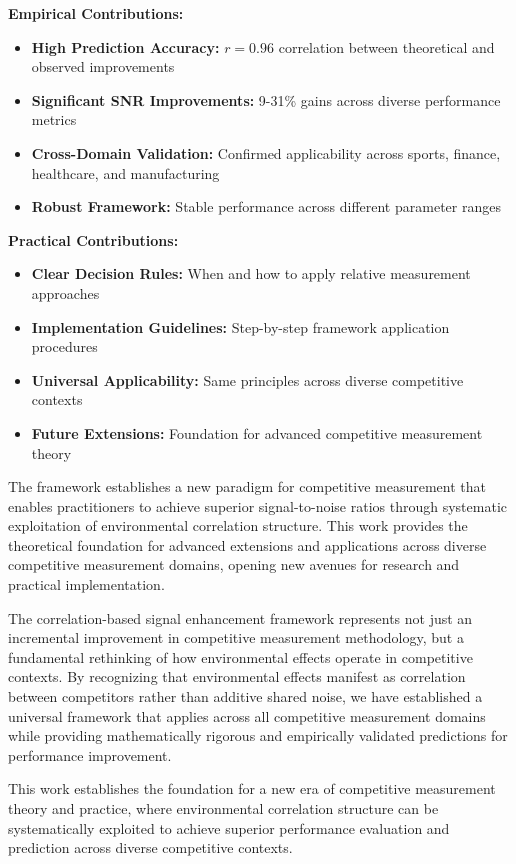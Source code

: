 \textbf{Empirical Contributions:}
\begin{itemize}
    \item \textbf{High Prediction Accuracy:} $r = 0.96$ correlation between theoretical and observed improvements
    \item \textbf{Significant SNR Improvements:} 9-31\% gains across diverse performance metrics
    \item \textbf{Cross-Domain Validation:} Confirmed applicability across sports, finance, healthcare, and manufacturing
    \item \textbf{Robust Framework:} Stable performance across different parameter ranges
\end{itemize}

\textbf{Practical Contributions:}
\begin{itemize}
    \item \textbf{Clear Decision Rules:} When and how to apply relative measurement approaches
    \item \textbf{Implementation Guidelines:} Step-by-step framework application procedures
    \item \textbf{Universal Applicability:} Same principles across diverse competitive contexts
    \item \textbf{Future Extensions:} Foundation for advanced competitive measurement theory
\end{itemize}

The framework establishes a new paradigm for competitive measurement that enables practitioners to achieve superior signal-to-noise ratios through systematic exploitation of environmental correlation structure. This work provides the theoretical foundation for advanced extensions and applications across diverse competitive measurement domains, opening new avenues for research and practical implementation.

The correlation-based signal enhancement framework represents not just an incremental improvement in competitive measurement methodology, but a fundamental rethinking of how environmental effects operate in competitive contexts. By recognizing that environmental effects manifest as correlation between competitors rather than additive shared noise, we have established a universal framework that applies across all competitive measurement domains while providing mathematically rigorous and empirically validated predictions for performance improvement.

This work establishes the foundation for a new era of competitive measurement theory and practice, where environmental correlation structure can be systematically exploited to achieve superior performance evaluation and prediction across diverse competitive contexts.
